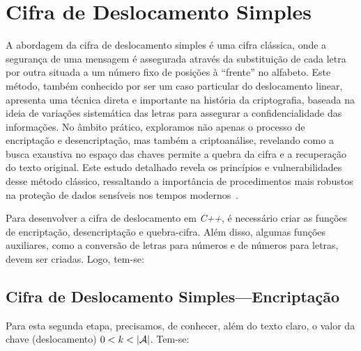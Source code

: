 \section{Cifra de Deslocamento Simples}
\label{sec:CifraDeslocamentoSimples}

A abordagem da cifra de deslocamento simples é uma cifra clássica, onde a segurança de uma mensagem é assegurada através da substituição de cada letra por outra situada a um número fixo de posições à ``frente'' no alfabeto. Este método, também conhecido por ser um caso particular do deslocamento linear, apresenta uma técnica direta e importante na história da criptografia, baseada na ideia de variações sistemática das letras para assegurar a confidencialidade das informações. No âmbito prático, exploramos não apenas o processo de encriptação e desencriptação, mas também a criptoanálise, revelando como a busca exaustiva no espaço das chaves permite a quebra da cifra e a recuperação do texto original. Este estudo detalhado revela os princípios e vulnerabilidades desse método clássico, ressaltando a importância de procedimentos mais robustos na proteção de dados sensíveis nos tempos modernos~\cite[Cap.4]{Songo2024}.

Para desenvolver a cifra de deslocamento em \emph{C++}, é necessário criar as funções de encriptação, desencriptação e quebra-cifra. Além disso, algumas funções auxiliares, como a conversão de letras para números e de números para letras, devem ser criadas. Logo, tem-se:



\subsection{Cifra de Deslocamento Simples---Encriptação}
\label{sec:CDSEncriptacao}

Para esta segunda etapa, precisamos, de conhecer, além do texto claro, o valor da chave (deslocamento) $0<k<|\cal A|$. Tem-se:

